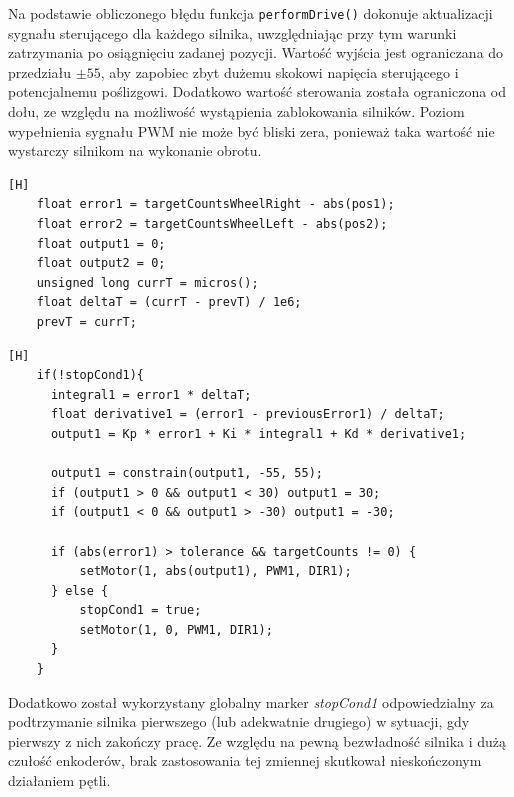 Na podstawie obliczonego błędu funkcja \texttt{performDrive()} dokonuje aktualizacji sygnału sterującego dla każdego silnika, uwzględniając przy tym warunki zatrzymania po osiągnięciu zadanej pozycji. Wartość wyjścia jest ograniczana do przedziału \( \pm 55 \), aby zapobiec zbyt dużemu skokowi napięcia sterującego i potencjalnemu poślizgowi. Dodatkowo wartość sterowania została ograniczona od dołu, ze względu na możliwość wystąpienia zablokowania silników. Poziom wypełnienia sygnału PWM nie może być bliski zera, ponieważ taka wartość nie wystarczy silnikom na wykonanie obrotu. 

\vspace*{0.5cm}


\begin{lstlisting}[caption=Inicjalizacja zmiennych na początku wykonywania algorytmu sterowania, label=lst:init-params, captionpos=b][H]
    float error1 = targetCountsWheelRight - abs(pos1);
    float error2 = targetCountsWheelLeft - abs(pos2);
    float output1 = 0;
    float output2 = 0;
    unsigned long currT = micros();
    float deltaT = (currT - prevT) / 1e6;
    prevT = currT;
\end{lstlisting}

\vspace*{0.5cm}


\begin{lstlisting}[caption=Fragment przedstawiający realizację regulacji PID,label=fig:pseudokod:pid, captionpos=b][H]
    if(!stopCond1){
      integral1 = error1 * deltaT;
      float derivative1 = (error1 - previousError1) / deltaT;
      output1 = Kp * error1 + Ki * integral1 + Kd * derivative1;

      output1 = constrain(output1, -55, 55);
      if (output1 > 0 && output1 < 30) output1 = 30;
      if (output1 < 0 && output1 > -30) output1 = -30;

      if (abs(error1) > tolerance && targetCounts != 0) {
          setMotor(1, abs(output1), PWM1, DIR1);
      } else {
          stopCond1 = true;
          setMotor(1, 0, PWM1, DIR1);
      }
    }
\end{lstlisting}

\vspace*{0.5cm}


Dodatkowo został wykorzystany globalny marker \textit{stopCond1} odpowiedzialny za podtrzymanie silnika pierwszego (lub adekwatnie drugiego) w sytuacji, gdy pierwszy z nich zakończy pracę. Ze względu na pewną bezwładność silnika i dużą czułość enkoderów, brak zastosowania tej zmiennej skutkował nieskończonym działaniem pętli. 

